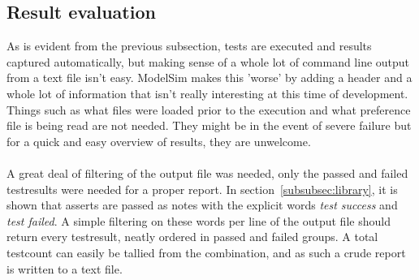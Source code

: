\documentclass[11pt,british]{article}
\begin{document}
\subsection{Result evaluation}
As is evident from the previous subsection, tests are executed and results captured automatically, but making sense of a whole lot of command line output from a text file isn't easy. ModelSim makes this 'worse' by adding a header and a whole lot of information that isn't really interesting at this time of development. Things such as what files were loaded prior to the execution and what preference file is being read are not needed. They might be in the event of severe failure but for a quick and easy overview of results, they are unwelcome.\\
\\
A great deal of filtering of the output file was needed, only the passed and failed testresults were needed for a proper report. In section~\ref{subsubsec:library}, it is shown that asserts are passed as notes with the explicit words \emph{test success} and \emph{test failed}. A simple filtering on these words per line of the output file should return every testresult, neatly ordered in passed and failed groups. A total testcount can easily be tallied from the combination, and as such a crude report is written to a text file.
\end{document}

